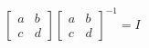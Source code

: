 \documentclass[preview]{standalone}
\begin{document}
\begin{align*}
\begin{bmatrix} a & b \\ c & d \end{bmatrix}\begin{bmatrix} a & b \\ c & d \end{bmatrix}^{-1} = I
\end{align*}
\end{document}

